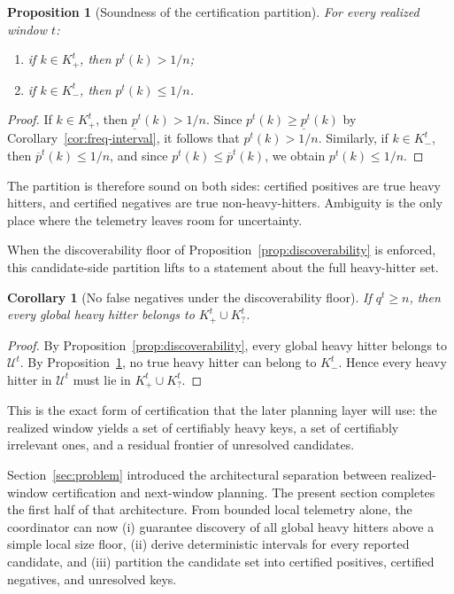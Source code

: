 \documentclass[sigconf, nonacm]{acmart}
\newtheorem{proposition}{Proposition}
\newtheorem{corollary}{Corollary}
\begin{document}
\begin{proposition}[Soundness of the certification partition]
\label{prop:partition-sound}
For every realized window \(t\):
\begin{enumerate}[leftmargin=*]
    \item if \(k \in K_+^t\), then \(p^t(k) > 1/n\);
    \item if \(k \in K_-^t\), then \(p^t(k) \le 1/n\).
\end{enumerate}
\end{proposition}

\begin{proof}
If \(k \in K_+^t\), then \(\underline p^t(k) > 1/n\). Since \(p^t(k) \ge \underline p^t(k)\) by Corollary~\ref{cor:freq-interval}, it follows that \(p^t(k) > 1/n\). Similarly, if \(k \in K_-^t\), then \(\overline p^t(k) \le 1/n\), and since \(p^t(k) \le \overline p^t(k)\), we obtain \(p^t(k) \le 1/n\).
\end{proof}

The partition is therefore sound on both sides: certified positives are true heavy hitters, and certified negatives are true non-heavy-hitters. Ambiguity is the only place where the telemetry leaves room for uncertainty.

When the discoverability floor of Proposition~\ref{prop:discoverability} is enforced, this candidate-side partition lifts to a statement about the full heavy-hitter set.

\begin{corollary}[No false negatives under the discoverability floor]
\label{cor:no-false-negatives}
If \(q^t \ge n\), then every global heavy hitter belongs to \(K_+^t \cup K_?^t\).
\end{corollary}

\begin{proof}
By Proposition~\ref{prop:discoverability}, every global heavy hitter belongs to \(\mathcal U^t\). By Proposition~\ref{prop:partition-sound}, no true heavy hitter can belong to \(K_-^t\). Hence every heavy hitter in \(\mathcal U^t\) must lie in \(K_+^t \cup K_?^t\).
\end{proof}

This is the exact form of certification that the later planning layer will use: the realized window yields a set of certifiably heavy keys, a set of certifiably irrelevant ones, and a residual frontier of unresolved candidates.

Section~\ref{sec:problem} introduced the architectural separation between realized-window certification and next-window planning. The present section completes the first half of that architecture. From bounded local telemetry alone, the coordinator can now (i) guarantee discovery of all global heavy hitters above a simple local size floor, (ii) derive deterministic intervals for every reported candidate, and (iii) partition the candidate set into certified positives, certified negatives, and unresolved keys.
\end{document}
